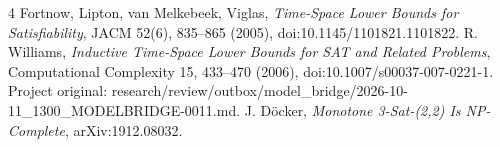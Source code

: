 \documentclass[11pt]{article}
\begin{document}
\begin{thebibliography}{4}
 Fortnow, Lipton, van Melkebeek, Viglas, \emph{Time-Space Lower Bounds for Satisfiability}, JACM 52(6), 835--865 (2005), doi:10.1145/1101821.1101822.
 R. Williams, \emph{Inductive Time-Space Lower Bounds for SAT and Related Problems}, Computational Complexity 15, 433--470 (2006), doi:10.1007/s00037-007-0221-1.
 Project original: research/review/outbox/model_bridge/2026-10-11_1300_MODELBRIDGE-0011.md.
 J. D\"ocker, \emph{Monotone 3-Sat-(2,2) Is NP-Complete}, arXiv:1912.08032.
\end{thebibliography}
\end{document}
